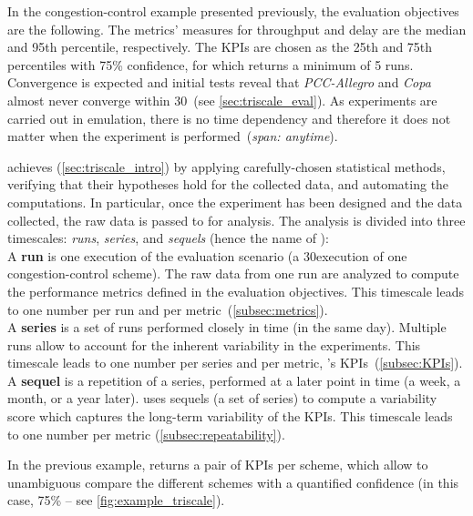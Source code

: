 In the congestion-control example presented previously, the evaluation objectives are the following.
The metrics' measures for throughput and delay are the median and 95th percentile, respectively.
The KPIs are chosen as the 25th and 75th percentiles with 75\% confidence, for which \triscale returns a minimum of 5 runs.
Convergence is expected and initial tests reveal that \textit{PCC-Allegro} and \textit{Copa} almost never converge within 30\s~(see \cref{sec:triscale_eval}).
As experiments are carried out in emulation, there is no time dependency and therefore it does not matter when the experiment is performed~(\ie \emph{span: anytime}).


\triscale achieves  (\cref{sec:triscale_intro}) by
applying carefully-chosen statistical methods, verifying that their hypotheses hold for the collected data, and automating the computations.
In particular, once the experiment has been designed and the data collected, the raw data is passed to \triscale for analysis.
The analysis is divided into three timescales: \emph{runs}, \emph{series}, and \emph{sequels} (hence the name of \triscale):\\
  A \textbf{run} is one execution of the evaluation scenario (\eg a 30\s execution of one congestion-control scheme).
  The raw data from one run are analyzed to compute the performance metrics defined in the evaluation objectives.
  This timescale leads to one number per run and per metric~(\cref{subsec:metrics}).\\
  A \textbf{series} is a set of runs performed closely in time (\eg in the same day).
  Multiple runs allow to account for the inherent variability in the experiments.
  This timescale leads to one number per series and per metric, \ie \triscale's KPIs~(\cref{subsec:KPIs}).\\
  A \textbf{sequel} is a repetition of a series, performed at a later point in time (\eg a week, a month, or a year later).
  \triscale uses sequels (\ie a set of series) to compute a variability score which captures the long-term variability of the KPIs.
  This timescale leads to one number per metric (\cref{subsec:repeatability}).
%

In the previous example, \triscale returns a pair of KPIs per scheme, which allow to unambiguous compare the different schemes with a quantified confidence (in this case, 75\% -- see \cref{fig:example_triscale}).
